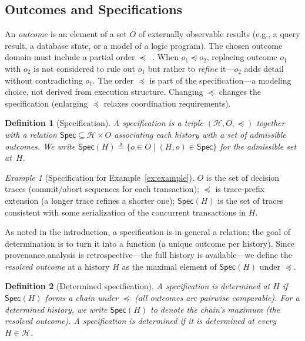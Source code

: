 \documentclass[acmsmall,review,anonymous]{acmart}
\newcommand{\Hist}{\mathcal{H}}
\newcommand{\Spec}{\mathsf{Spec}}
\newcommand{\Ord}{\preceq}
\newtheorem{definition}{Definition}
\theoremstyle{remark}
\newtheorem{example}{Example}
\numberwithin{definition}{section}
\numberwithin{theorem}{section}
\numberwithin{lemma}{section}
\numberwithin{corollary}{section}
\numberwithin{remark}{section}
\numberwithin{example}{section}
\numberwithin{observation}{section}
\numberwithin{assumption}{section}
\begin{document}
\subsection{Outcomes and Specifications}
An \emph{outcome} is an element of a set $O$ of externally
observable results (e.g., a query result, a database state, or a model of a
logic program).
The chosen outcome domain must include a partial order
$\Ord$~\cite{anon2026coordinationcriterion}.
When $o_1 \Ord o_2$, replacing outcome $o_1$ with $o_2$ is not considered
to rule out $o_1$ but rather to \emph{refine} it---$o_2$ adds detail
without contradicting $o_1$.
The order $\Ord$ is part of the specification---a modeling choice, not
derived from execution structure. Changing $\Ord$ changes the
specification (enlarging $\Ord$ relaxes coordination requirements).

\begin{definition}[Specification]
  A \emph{specification} is a triple $(\Hist, O, \Ord)$ together with a
  relation $\Spec \subseteq \Hist \times O$
  associating each history with a set of \emph{admissible outcomes}.
  We write $\Spec(H) \triangleq \{o \in O \mid (H,o) \in \Spec\}$ for the
  admissible set at~$H$.
\end{definition}

\begin{example}[Specification for Example~\ref{ex:example}]
  \label{ex:spec}
  $O$ is the set of decision traces (commit/abort sequences for each
  transaction); $\Ord$ is trace-prefix extension (a longer trace
  refines a shorter one); $\Spec(H)$ is the set of traces consistent
  with some serialization of the concurrent transactions in $H$.
\end{example}

\noindent
As noted in the introduction, a specification is in general a
relation; the goal of determination is to turn it into a function
(a unique outcome per history).
Since provenance analysis is retrospective---the full history is
available---we define the \emph{resolved outcome} at a history $H$ as
the maximal element of $\Spec(H)$ under $\Ord$.

\begin{definition}[Determined specification]
  \label{def:determined}
  A specification is \emph{determined} at $H$ if $\Spec(H)$ forms a
  chain under $\Ord$ (all outcomes are pairwise comparable).
  For a determined history, we write $\Spec(H)$ to denote the chain's
  maximum (the resolved outcome).
  A specification is \emph{determined} if it is determined at every
  $H \in \Hist$.
\end{definition}
\end{document}
